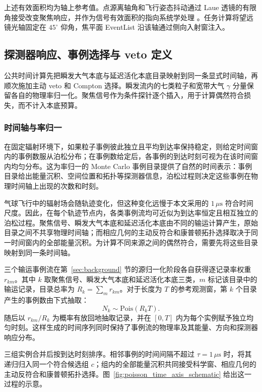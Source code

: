 \documentclass[11pt]{article}
\begin{document}
上述有效面积均为轴上参考值。点源离轴角和飞行姿态抖动通过 Laue 透镜的有限角接受改变聚焦响应，并作为信号有效面积的指向系统学处理 \cite{Barriere2009Laue,Weidenspointner2006MAX}。任务计算将望远镜光轴固定在 $45^\circ$ 仰角，焦平面 EventList 沿该轴通过侧向入射窗注入。

\subsection{探测器响应、事例选择与 veto 定义}
\label{sec:selection}

公共时间计算先把瞬发大气本底与延迟活化本底目录映射到同一条显式时间轴，再顺次施加主动 veto 和 Compton 选择。瞬发流内的七类粒子和宽带大气 $\gamma$ 分量保留各自的物理率归一化。聚焦信号作为条件探针逐个插入，用于计算偶然符合损失，而不计入本底预算。

\subsubsection{时间轴与率归一}
\label{subsec:time_axis_zh}

在固定辐射环境下，如果粒子事例彼此独立且平均到达率保持稳定，则给定时间窗内的事例数服从泊松分布；在事例数给定后，各事例的到达时刻可视为在该时间窗内均匀分布。这为率归一的 Monte Carlo 事例目录提供了自然的时间表示：事例目录给出能量沉积、空间位置和拓扑等探测器信息，泊松过程则决定这些事例在物理时间轴上出现的次数和时刻。

气球飞行中的辐射场会随轨迹变化，但这种变化远慢于本文采用的 $1\,\mu\mathrm{s}$ 符合时间尺度。因此，在每个轨迹节点内，各类事例流均可近似为到达率恒定且相互独立的泊松过程。聚焦信号、瞬发大气本底和延迟活化本底由不同的输运计算产生，原始目录之间不共享物理时间轴；而相应几何的主动反符合和康普顿拓扑选择取决于同一时间窗内的全部能量沉积。为计算不同来源之间的偶然符合，需要先将这些目录映射到同一条时间轴。

三个输运事例流在第~\ref{sec:background} 节的源归一化阶段各自获得逐记录率权重 $r_{km}$。其中 $k$ 取聚焦信号、瞬发大气本底和延迟活化本底三类，$m$ 标记该目录中的输运记录，目录总率为 $R_k=\sum_m r_{km}$。对于长度为 $T$ 的参考观测窗，第 $k$ 个目录产生的事例数由下式抽取：
\begin{equation}
 N_k\sim\mathrm{Pois}(R_kT).
 \label{eq:poisson_superposition_zh}
\end{equation}
随后以 $r_{km}/R_k$ 为概率有放回地抽取记录，并在 $[0,T]$ 内为每个实例赋予独立均匀时刻。这样生成的时间序列同时保持了事例流的物理率及其能量、方向和探测器响应分布。

三组实例合并后按到达时刻排序。相邻事例的时间间隔不超过 $\tau=1\,\mu\mathrm{s}$ 时，将其递归归入同一个符合候选组 $c$；组内的全部能量沉积共同接受科学窗、相应几何的主动反符合和康普顿拓扑选择。图~\ref{fig:poisson_time_axis_schematic} 给出这一过程的示意。
\end{document}
